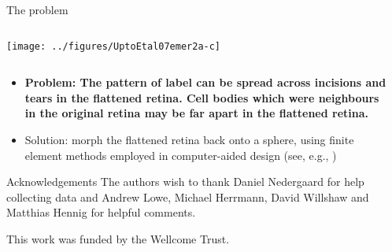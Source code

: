\documentclass[final,hyperref={pdfpagelabels=false}]{beamer}
\newcommand{\figack}[1]{{\par\small\vskip -0.5ex\hfill{\color{blue} #1}\par}}
\begin{document}
\begin{frame}{}
\begin{columns}[T]
\begin{column}{.33\linewidth}
\begin{block}{The problem}
\begin{columns}
\begin{column}{0.25\linewidth}
            \texttt{[image: ../figures/UptoEtal07emer2a-c]}
          \end{column}
        \end{columns}


        \begin{itemize}
        \item \textbf{Problem: The pattern of label can be spread
            across incisions and tears in the flattened retina. Cell
            bodies which were neighbours in the original retina may be
            far apart in the flattened retina.}
        \item Solution: morph the flattened retina back onto a sphere,
          using finite element methods employed in computer-aided
          design (see, e.g., \citealp{MaCaEtal99flat})
        \end{itemize}
      \end{block}

      \begin{block}{\large Acknowledgements}
        \small
        The authors wish to thank Daniel Nedergaard for help
        collecting data and  Andrew Lowe, Michael Herrmann, David
        Willshaw and Matthias Hennig for helpful comments.

        This work was funded by the Wellcome Trust.
      \end{block}




    \end{column}

    \begin{column}{.33\linewidth}


\end{column}
\end{columns}
\end{frame}
\end{document}
